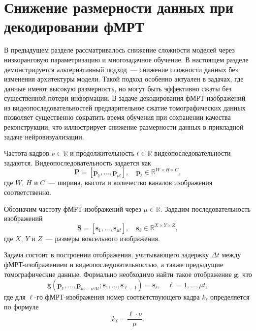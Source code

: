 \section{Снижение размерности данных при декодировании фМРТ}

В предыдущем разделе рассматривалось снижение сложности моделей через низкоранговую параметризацию и многозадачное обучение.
В настоящем разделе демонстрируется альтернативный подход~--- снижение сложности данных без изменения архитектуры модели.
Такой подход особенно актуален в задачах, где данные имеют высокую размерность, но могут быть эффективно сжаты без существенной потери информации.
В задаче декодирования фМРТ-изображений из видеопоследовательностей предварительное сжатие томографических данных позволяет существенно сократить время обучения при сохранении качества реконструкции, что иллюстрирует снижение размерности данных в прикладной задаче нейровизуализации.

Частота кадров $\nu \in \mathbb{R}$ и продолжительность $t \in \mathbb{R}$ видеопоследовательности задаются.
Видеопоследовательность задается как
\begin{equation}
	\label{eq1}
	\mathbf{P} = [\mathbf{p}_1, \ldots, \mathbf{p}_{\nu t}], \quad \mathbf{p}_{\ell} \in \mathbb{R}^{W \times H \times C},
\end{equation}
где $W$, $H$ и $C$~--- ширина, высота и количество каналов изображения соответственно.

Обозначим частоту фМРТ-изображений через $\mu \in \mathbb{R}$.
Зададим последовательность изображений
\begin{equation}
	\label{eq2}
	\mathbf{S} = [\mathbf{s}_1, \ldots, \mathbf{s}_{\mu t}], \quad \mathbf{s}_{\ell} \in \mathbb{R}^{X \times Y \times Z},
\end{equation}
где $X$, $Y$ и $Z$~--- размеры воксельного изображения.

Задача состоит в построении отображения, учитывающего задержку $\Delta t$ между фМРТ-изображением и видеопоследовательностью, а также предыдущие томографические данные.
Формально необходимо найти такое отображение $\mathbf{g}$, что
\begin{equation}
	\label{eq3}
	\mathbf{g}(\mathbf{p}_1, \ldots, \mathbf{p}_{k_{\ell} - \nu \Delta t}; \mathbf{s}_1, \ldots, \mathbf{s}_{\ell-1}) = \mathbf{s}_{\ell}, \quad \ell = 1, \ldots, \mu t,
\end{equation}
где для $\ell$-го фМРТ-изображения номер соответствующего кадра $k_{\ell}$ определяется по формуле
\begin{equation}
	\label{eq4}
	k_{\ell} = \dfrac{\ell \cdot \nu}{\mu}.
\end{equation}

